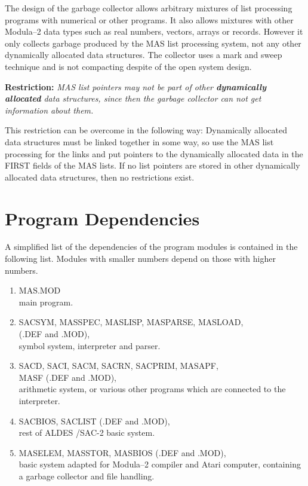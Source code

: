 The design of the 
garbage collector allows arbitrary 
mixtures of list  processing programs with 
numerical or other
programs. It also allows mixtures with other Modula--2 
data types 
such as real numbers, vectors, arrays or records. 
However it only collects garbage produced by the MAS list processing
system, not any other dynamically allocated data 
structures.
The collector uses a mark and sweep technique and 
is not compacting despite of the open system design.

{\bf Restriction:} 
{\em MAS list pointers may not be part of other 
{\bf dynamically allocated} data structures, 
since then the garbage collector 
can not get information about them.} 

This restriction can be overcome in the following way:
Dynamically allocated data structures must be linked together
in some way, so use the MAS list processing for the links and
put pointers to the dynamically allocated data in the FIRST fields 
of the MAS lists. 
If no list pointers are stored in other dynamically allocated
data structures, then no restrictions exist.


\section{Program Dependencies}

A simplified list  of the dependencies 
of the program modules
is contained in the following list. 
Modules with smaller numbers depend on those with higher numbers.
 
\begin{enumerate}
\item MAS.MOD \\
      main program.
\item SACSYM, MASSPEC, MASLISP, MASPARSE, MASLOAD, \\
      (.DEF and .MOD), \\
      symbol system, interpreter and parser.
\item SACD, SACI, SACM, SACRN, SACPRIM, MASAPF, \\ 
      MASF (.DEF and .MOD), \\
      arithmetic system, or various other 
      programs which are connected 
      to the interpreter.
\item SACBIOS, SACLIST (.DEF and .MOD), \\
      rest of ALDES /SAC-2 basic system.  
\item MASELEM, MASSTOR, MASBIOS (.DEF and .MOD), \\
      basic system adapted for Modula--2 compiler 
      and Atari computer,
      containing a garbage collector and file handling.
\end{enumerate}

